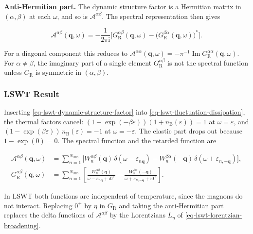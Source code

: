 \textbf{Anti-Hermitian part.} The dynamic structure factor is a Hermitian matrix in \((\alpha,\beta)\) at each \(\omega\), and so is \(\mathcal A^{\alpha\beta}\). The spectral representation then gives

\begin{equation}\label{eq-lswt-spectral-anti-hermitian}
\mathcal A^{\alpha\beta}(\mathbf q,\omega)
=-\frac{1}{2\pi\mathrm i}\Big[G_{\mathrm R}^{\alpha\beta}(\mathbf q,\omega)-\big(G_{\mathrm R}^{\beta\alpha}(\mathbf q,\omega)\big)^*\Big].
\end{equation}

For a diagonal component this reduces to \(\mathcal A^{\alpha\alpha}(\mathbf q,\omega)=-\pi^{-1}\operatorname{Im}G_{\mathrm R}^{\alpha\alpha}(\mathbf q,\omega)\). For \(\alpha\neq\beta\), the imaginary part of a single element \(G_{\mathrm R}^{\alpha\beta}\) is not the spectral function unless \(G_{\mathrm R}\) is symmetric in \((\alpha,\beta)\).

\subsubsection{LSWT Result}

Inserting \eqref{eq-lswt-dynamic-structure-factor} into \eqref{eq-lswt-fluctuation-dissipation}, the thermal factors cancel: \((1-\exp(-\beta\varepsilon))(1+n_{\mathrm B}(\varepsilon))=1\) at \(\omega=\varepsilon\), and \((1-\exp(\beta\varepsilon))\,n_{\mathrm B}(\varepsilon)=-1\) at \(\omega=-\varepsilon\). The elastic part drops out because \(1-\exp(0)=0\). The spectral function and the retarded function are

\begin{equation}\label{eq-lswt-spectral-function-lswt}
\begin{aligned}
\mathcal A^{\alpha\beta}(\mathbf q,\omega)
&=\sum_{n=1}^{N_{\mathrm{sub}}}\Big[W_n^{\alpha\beta}(\mathbf q)\,\delta(\omega-\varepsilon_{n\mathbf q})
-W_n^{\beta\alpha}(-\mathbf q)\,\delta(\omega+\varepsilon_{n,-\mathbf q})\Big],\\
G_{\mathrm R}^{\alpha\beta}(\mathbf q,\omega)
&=\sum_{n=1}^{N_{\mathrm{sub}}}\left[\frac{W_n^{\alpha\beta}(\mathbf q)}{\omega-\varepsilon_{n\mathbf q}+\mathrm i0^+}
-\frac{W_n^{\beta\alpha}(-\mathbf q)}{\omega+\varepsilon_{n,-\mathbf q}+\mathrm i0^+}\right].
\end{aligned}
\end{equation}

In LSWT both functions are independent of temperature, since the magnons do not interact. Replacing \(0^+\) by \(\eta\) in \(G_{\mathrm R}\) and taking the anti-Hermitian part replaces the delta functions of \(\mathcal A^{\alpha\beta}\) by the Lorentzians \(L_\eta\) of \eqref{eq-lswt-lorentzian-broadening}.

